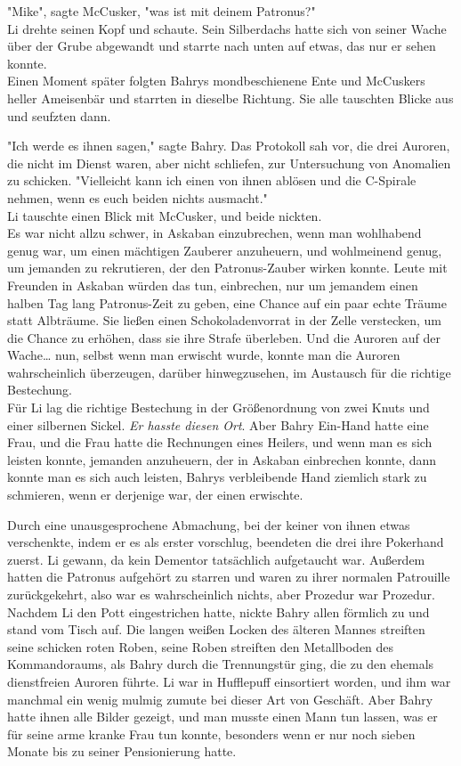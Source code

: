 {"Mike", sagte McCusker, "was ist mit deinem Patronus?"\\ Li drehte seinen Kopf und schaute. Sein Silberdachs hatte sich von seiner Wache über der Grube abgewandt und starrte nach unten auf etwas, das nur er sehen konnte.\\ Einen Moment später folgten Bahrys mondbeschienene Ente und McCuskers heller Ameisenbär und starrten in dieselbe Richtung. Sie alle tauschten Blicke aus und seufzten dann.

"Ich werde es ihnen sagen," sagte Bahry. Das Protokoll sah vor, die drei Auroren, die nicht im Dienst waren, aber nicht schliefen, zur Untersuchung von Anomalien zu schicken. "Vielleicht kann ich einen von ihnen ablösen und die C-Spirale nehmen, wenn es euch beiden nichts ausmacht."\\ Li tauschte einen Blick mit McCusker, und beide nickten.\\ Es war nicht allzu schwer, in Askaban einzubrechen, wenn man wohlhabend genug war, um einen mächtigen Zauberer anzuheuern, und wohlmeinend genug, um jemanden zu rekrutieren, der den Patronus-Zauber wirken konnte. Leute mit Freunden in Askaban würden das tun, einbrechen, nur um jemandem einen halben Tag lang Patronus-Zeit zu geben, eine Chance auf ein paar echte Träume statt Albträume. Sie ließen einen Schokoladenvorrat in der Zelle verstecken, um die Chance zu erhöhen, dass sie ihre Strafe überleben. Und die Auroren auf der Wache… nun, selbst wenn man erwischt wurde, konnte man die Auroren wahrscheinlich überzeugen, darüber hinwegzusehen, im Austausch für die richtige Bestechung.\\ Für Li lag die richtige Bestechung in der Größenordnung von zwei Knuts und einer silbernen Sickel. \emph{Er hasste diesen Ort}. Aber Bahry Ein-Hand hatte eine Frau, und die Frau hatte die Rechnungen eines Heilers, und wenn man es sich leisten konnte, jemanden anzuheuern, der in Askaban einbrechen konnte, dann konnte man es sich auch leisten, Bahrys verbleibende Hand ziemlich stark zu schmieren, wenn er derjenige war, der einen erwischte.

Durch eine unausgesprochene Abmachung, bei der keiner von ihnen etwas verschenkte, indem er es als erster vorschlug, beendeten die drei ihre Pokerhand zuerst. Li gewann, da kein Dementor tatsächlich aufgetaucht war. Außerdem hatten die Patronus aufgehört zu starren und waren zu ihrer normalen Patrouille zurückgekehrt, also war es wahrscheinlich nichts, aber Prozedur war Prozedur.\\ Nachdem Li den Pott eingestrichen hatte, nickte Bahry allen förmlich zu und stand vom Tisch auf. Die langen weißen Locken des älteren Mannes streiften seine schicken roten Roben, seine Roben streiften den Metallboden des Kommandoraums, als Bahry durch die Trennungstür ging, die zu den ehemals dienstfreien Auroren führte. Li war in Hufflepuff einsortiert worden, und ihm war manchmal ein wenig mulmig zumute bei dieser Art von Geschäft. Aber Bahry hatte ihnen alle Bilder gezeigt, und man musste einen Mann tun lassen, was er für seine arme kranke Frau tun konnte, besonders wenn er nur noch sieben Monate bis zu seiner Pensionierung hatte.

}
